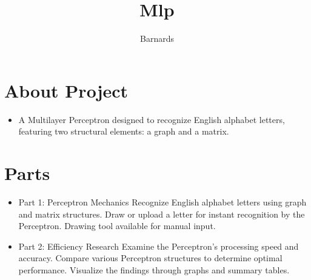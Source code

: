 \documentclass{article}
\title{Mlp}
\author{Barnards}
\begin{document}
\maketitle

\section{About Project}
\begin{itemize}
    \item A Multilayer Perceptron designed to recognize English alphabet letters, featuring two structural elements: a graph and a matrix.
\end{itemize}
\section{Parts}
\begin{itemize}
    \item Part 1: Perceptron Mechanics Recognize English alphabet letters using graph and matrix structures.
    Draw or upload a letter for instant recognition by the Perceptron. Drawing tool available for manual input.
    \item Part 2: Efficiency Research Examine the Perceptron's processing speed and accuracy. Compare various Perceptron structures to determine optimal performance. Visualize the findings through graphs and summary tables.
\end{itemize}
\end{document}
